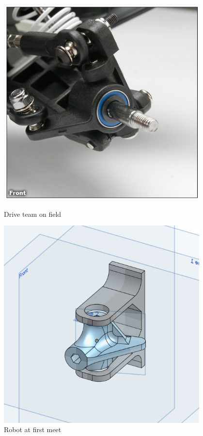 \begin{figure}[ht]
\centering
\begin{minipage}[b]{.48\textwidth}
  \centering
  \includegraphics[width=0.95\textwidth]{Meetings/October/10-22-22/10-2-22_CAD_Figure1.PNG}
  \caption{Drive team on field}
  \label{fig:pic1}
\end{minipage}%
\hfill%
\begin{minipage}[b]{.48\textwidth}
  \centering
  \includegraphics[width=0.95\textwidth]{Meetings/October/10-22-22/10-2-22_CAD_Figure2.PNG}
  \caption{Robot at first meet}
  \label{fig:pic2}
\end{minipage}
\end{figure}
